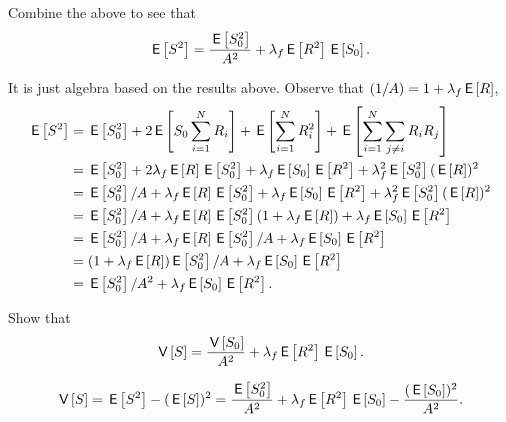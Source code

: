 \begin{extra}
 Combine the above to see that
 \begin{equation*}
 \E{S^2} = \frac{\E{S_0^2}}{A^2} + \lambda_f \E{R^2} \E{S_0}.
 \end{equation*}
\begin{solution}
It is just algebra based on the results above.  Observe that $(1/A) = 1+\lambda_f \E R$,
\begin{align*}
  \E{S^2}
  &= \E{S_0^2} + 2\E{S_0 \sum_{i=1}^N R_i} + \E{\sum_{i=1}^N R_i^2} + \E{\sum_{i=1}^N \sum_{j\neq i} R_i R_j} \\
  &= \E{S_0^2} + 2 \lambda_f \E R \E{S_0^2} + \lambda_f \E{S_0 }\E{R^2} +  \lambda_f^2 \E{S_0^2} (\E{R})^2 \\
  &= \E{S_0^2}/A  +  \lambda_f \E R \E{S_0^2} + \lambda_f \E{S_0 }\E{R^2} +  \lambda_f^2 \E{S_0^2} (\E{R})^2 \\
  &= \E{S_0^2}/A  +  \lambda_f \E R \E{S_0^2}(1+\lambda_f \E R)  + \lambda_f \E{S_0 }\E{R^2}\\
  &= \E{S_0^2}/A  +  \lambda_f \E R \E{S_0^2}/A + \lambda_f \E{S_0 }\E{R^2}\\
  &= (1  +  \lambda_f \E R) \E{S_0^2}/A  + \lambda_f \E{S_0 }\E{R^2}\\
  &= \E{S_0^2}/A^2  + \lambda_f \E{S_0 }\E{R^2}.
\end{align*}
\end{solution}
\end{extra}

\begin{extra}
Show that 
 \begin{equation*}
 \V{S} = \frac{\V{S_0}}{A^2} + \lambda_f \E{R^2} \E{S_0}.
 \end{equation*}
\begin{solution} 
 \begin{equation*}
 \V{S} = \E{S^2} - (\E S)^2 = 
\frac{\E{S_0^2}}{A^2} + \lambda_f \E{R^2} \E{S_0} -\frac{(\E{S_0})^2}{A^2}.
 \end{equation*}
\end{solution}
\end{extra}

